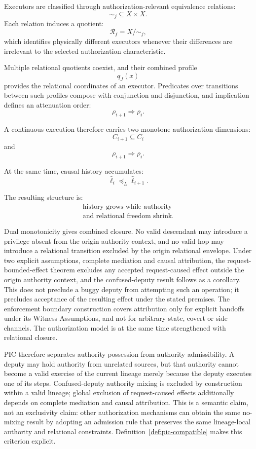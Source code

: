 \documentclass[10pt,twocolumn]{article}
\newcommand{\Rel}{\mathcal{R}}
\begin{document}
Executors are classified through authorization-relevant equivalence relations:
\[
\sim_j\subseteq X\times X.
\]
Each relation induces a quotient:
\[
\Rel_j=X/{\sim_j},
\]
which identifies physically different executors whenever their differences are
irrelevant to the selected authorization characteristic.

Multiple relational quotients coexist, and their combined profile
\[
q_J(x)
\]
provides the relational coordinates of an executor. Predicates over transitions
between such profiles compose with conjunction and disjunction, and implication
defines an attenuation order:
\[
\rho_{i+1}\Rightarrow\rho_i.
\]

A continuous execution therefore carries two monotone authorization dimensions:
\[
C_{i+1}\subseteq C_i
\]
and
\[
\rho_{i+1}\Rightarrow\rho_i.
\]

At the same time, causal history accumulates:
\[
\widehat{\ell}_i\preceq_L\widehat{\ell}_{i+1}.
\]

The resulting structure is:
\[
\boxed{
\begin{gathered}
\text{history grows while authority}\\
\text{and relational freedom shrink.}
\end{gathered}
}
\]

Dual monotonicity gives combined closure. No valid descendant may introduce a
privilege absent from the origin authority context, and no valid hop may
introduce a relational transition excluded by the origin relational envelope.
Under two explicit assumptions, complete mediation and causal attribution, the
request-bounded-effect theorem excludes any accepted request-caused effect
outside the origin authority context, and the confused-deputy result follows as
a corollary. This does not preclude a buggy deputy from attempting such an
operation; it precludes acceptance of the resulting effect under the stated
premises. The enforcement boundary construction covers attribution only for
explicit handoffs under its Witness Assumptions, and not for arbitrary state,
covert or side channels. The authorization model is at the same time
strengthened with relational closure.

PIC therefore separates authority possession from authority admissibility. A
deputy may hold authority from unrelated sources, but that authority cannot
become a valid exercise of the current lineage merely because the deputy
executes one of its steps. Confused-deputy authority mixing is excluded by
construction within a valid lineage; global exclusion of request-caused effects
additionally depends on complete mediation and causal attribution.
This is a semantic claim, not an exclusivity claim: other authorization
mechanisms can obtain the same no-mixing result by adopting an admission rule
that preserves the same lineage-local authority and relational constraints.
Definition~\ref{def:pic-compatible} makes this criterion explicit.
\end{document}
